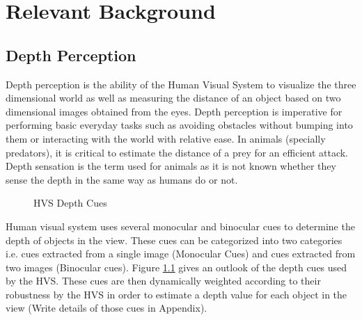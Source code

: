 \chapter{Relevant Background}
\label{chap:reletiveBackground}

\section{Depth Perception}
Depth perception is the ability of the Human Visual System  to visualize the three dimensional world as well as measuring the distance of an object based on two dimensional images obtained from the eyes. Depth perception is imperative for performing basic everyday tasks such as avoiding obstacles without bumping into them or interacting with the world with relative ease. In animals (specially predators), it is critical to estimate the distance of a prey for an efficient attack. Depth sensation is the term used for animals as it is not known whether they sense the depth in the same way as humans do or not\cite{ wiki:depth_perception}.

\begin{figure}
\caption{HVS Depth Cues\label{fig:CueTree}}
\end{figure}

Human visual system  uses several monocular and binocular cues to determine the depth of objects in the view. These cues can be categorized into two categories i.e. cues extracted from a single image (Monocular Cues) and cues extracted from two images (Binocular cues)\cite{depthcues1}\cite{ wiki:depth_perception}. Figure \ref{fig:CueTree} gives an outlook of the depth cues used by the HVS. These cues are then dynamically weighted according to their robustness by the HVS in order to estimate a depth value for each object in the view \cite{CueFusion}(Write details of those cues in Appendix).


